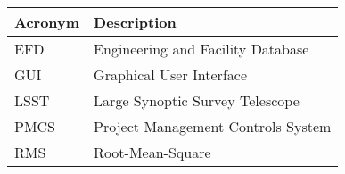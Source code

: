 \addtocounter{table}{-1}
\begin{longtable}{p{}p{}}\hline
\textbf{Acronym} & \textbf{Description}  \\\hline

EFD & Engineering and Facility Database \\\hline
GUI & Graphical User Interface \\\hline
LSST & Large Synoptic Survey Telescope \\\hline
PMCS & Project Management Controls System \\\hline
RMS & Root-Mean-Square \\\hline
\end{longtable}
